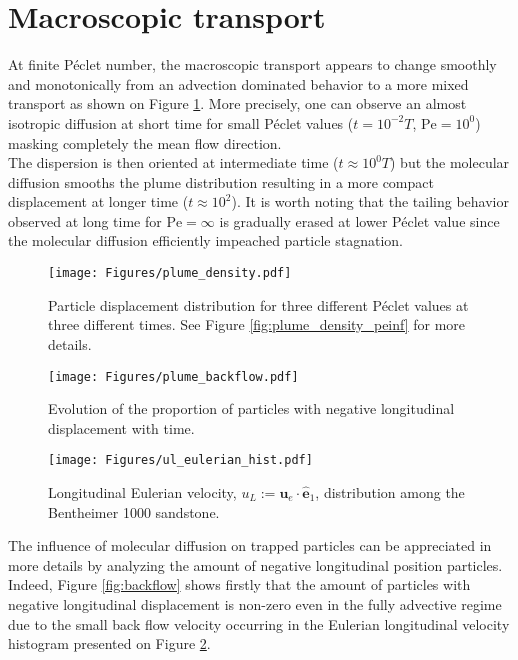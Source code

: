 \section{Macroscopic transport}
At finite Péclet number, the macroscopic transport appears to change smoothly and monotonically from an advection dominated behavior to a more mixed transport as shown on Figure \ref{fig:plume_density}.
More precisely, one can observe an almost isotropic diffusion at short time for small Péclet values ($t=10^{-2}T$, $\mathrm{Pe} = 10^0$) masking completely the mean flow direction.\\
The dispersion is then oriented at intermediate time ($t\approx 10^0T$) but the molecular diffusion smooths the plume distribution resulting in a more compact displacement at longer time ($t\approx 10^2$).
It is worth noting that the tailing behavior observed at long time for $\mathrm{Pe}=\infty$ is gradually erased at lower Péclet value since the molecular diffusion efficiently impeached particle stagnation.\\
\begin{figure}[h!]
	\centering
	\texttt{[image: Figures/plume\_density.pdf]}
	\caption{Particle displacement distribution for three different Péclet values at three different times. See Figure \ref{fig:plume_density_peinf} for more details.}
	\label{fig:plume_density}
\end{figure}
\begin{figure}[h!]
	\centering
	\begin{minipage}{.49\textwidth}
		\centering
		\texttt{[image: Figures/plume\_backflow.pdf]}
		\caption{Evolution of the proportion of particles with negative longitudinal displacement with time.}
		\label{fig:backflow}
	\end{minipage}%
	\begin{minipage}{.49\textwidth}
		\centering
		\texttt{[image: Figures/ul\_eulerian\_hist.pdf]}
		\caption{Longitudinal Eulerian velocity, $u_L:=\textbf{u}_e\cdot\hat{\textbf{e}}_1$, distribution among the Bentheimer 1000 sandstone.}
		\label{fig:ul_eulerian_hist}
	\end{minipage}
\end{figure}
The influence of molecular diffusion on trapped particles can be appreciated in more details by analyzing the amount of negative longitudinal position particles. 
Indeed, Figure \ref{fig:backflow} shows firstly that the amount of particles with negative longitudinal displacement is non-zero even in the fully advective regime due to the small back flow velocity occurring in the Eulerian longitudinal velocity histogram presented on Figure \ref{fig:ul_eulerian_hist}.\\
